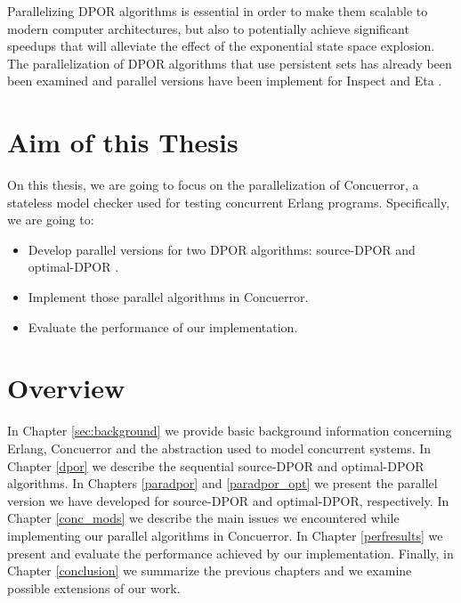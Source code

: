 Parallelizing DPOR algorithms is essential in order to make them scalable to modern computer architectures, but also to potentially 
achieve significant speedups that will alleviate the effect of the exponential state space explosion. The parallelization of DPOR algorithms that use persistent sets \cite{FlanaganDPOR, Lei:2006:RTC:1248722.1248743, 10.1007/3-540-53863-1_36} has already been 
been examined and parallel versions have been implement for Inspect \cite{yang2008inspect} and Eta 
\cite{Simsa2012ScalableDP}.

\section{Aim of this Thesis}

On this thesis, we are going to focus on the parallelization of Concuerror, a stateless model checker
used for testing concurrent Erlang programs. Specifically, we are going to: 

\begin{itemize}
\item Develop parallel versions for two DPOR algorithms: source-DPOR \cite{AbdullaAronisJohnssonSagonasDPOR2014} and optimal-DPOR \cite{AbdullaAronisJohnssonSagonasDPOR2014}.
\item Implement those parallel algorithms in Concuerror.
\item Evaluate the performance of our implementation.

\end{itemize}

\section{Overview}

In Chapter \ref{sec:background} we provide basic background information concerning Erlang, Concuerror and the abstraction used to model concurrent systems. In Chapter \ref{dpor} we describe the sequential source-DPOR and optimal-DPOR algorithms. In Chapters \ref{paradpor} and \ref{paradpor_opt} we present the parallel version we have developed for source-DPOR and optimal-DPOR, respectively. In Chapter 
\ref{conc_mods} we describe the main issues we encountered while implementing our parallel algorithms in Concuerror.
In Chapter \ref{perfresults} we present and evaluate the performance achieved by our implementation. Finally, in Chapter \ref{conclusion}
we summarize the previous chapters and we examine possible extensions of our work.
